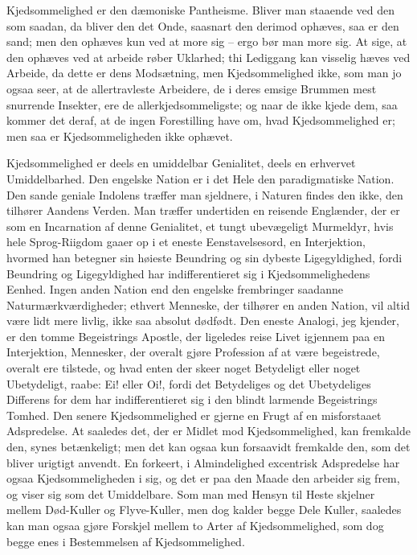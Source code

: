 \documentclass[12pt,a4paper]{article}
\begin{document}
Kjedsommelighed er den dæmoniske Pantheisme. Bliver man staaende ved den som saadan, da bliver den det Onde, saasnart den derimod ophæves, saa er den sand; men den ophæves kun ved at more sig – ergo bør man more sig. At sige, at den ophæves ved at arbeide røber Uklarhed; thi Lediggang kan visselig hæves ved Arbeide, da dette er dens Modsætning, men Kjedsommelighed ikke, som man jo ogsaa seer, at de allertravleste Arbeidere, de i deres emsige Brummen mest snurrende Insekter, ere de allerkjedsommeligste; og naar de ikke kjede dem, saa kommer det deraf, at de ingen Forestilling have om, hvad Kjedsommelighed er; men saa er Kjedsommeligheden ikke ophævet.

Kjedsommelighed er deels en umiddelbar Genialitet, deels en erhvervet Umiddelbarhed. Den engelske Nation er i det Hele den paradigmatiske Nation. Den sande geniale Indolens træffer man sjeldnere, i Naturen findes den ikke, den tilhører Aandens Verden. Man træffer undertiden en reisende Englænder, der er som en Incarnation af denne Genialitet, et tungt ubevægeligt Murmeldyr, hvis hele Sprog-Riigdom gaaer op i et eneste Eenstavelsesord, en Interjektion, hvormed han betegner sin høieste Beundring og sin dybeste Ligegyldighed, fordi Beundring og Ligegyldighed har indifferentieret sig i Kjedsommelighedens Eenhed. Ingen anden Nation end den engelske frembringer saadanne Naturmærkværdigheder; ethvert Menneske, der tilhører en anden Nation, vil altid være lidt mere livlig, ikke saa absolut dødfødt. Den eneste Analogi, jeg kjender, er den tomme Begeistrings Apostle, der ligeledes reise Livet igjennem paa en Interjektion, Mennesker, der overalt gjøre Profession af at være begeistrede, overalt ere tilstede, og hvad enten der skeer noget Betydeligt eller noget Ubetydeligt, raabe: Ei! eller Oi!, fordi det Betydeliges og det Ubetydeliges Differens for dem har indifferentieret sig i den blindt larmende Begeistrings Tomhed. Den senere Kjedsommelighed er gjerne en Frugt af en misforstaaet Adspredelse. At saaledes det, der er Midlet mod Kjedsommelighed, kan fremkalde den, synes betænkeligt; men det kan ogsaa kun forsaavidt fremkalde den, som det bliver urigtigt anvendt. En forkeert, i Almindelighed excentrisk Adspredelse har ogsaa Kjedsommeligheden i sig, og det er paa den Maade den arbeider sig frem, og viser sig som det Umiddelbare. Som man med Hensyn til Heste skjelner mellem Død-Kuller og Flyve-Kuller, men dog kalder begge Dele Kuller, saaledes kan man ogsaa gjøre Forskjel mellem to Arter af Kjedsommelighed, som dog begge enes i Bestemmelsen af Kjedsommelighed.
\end{document}
